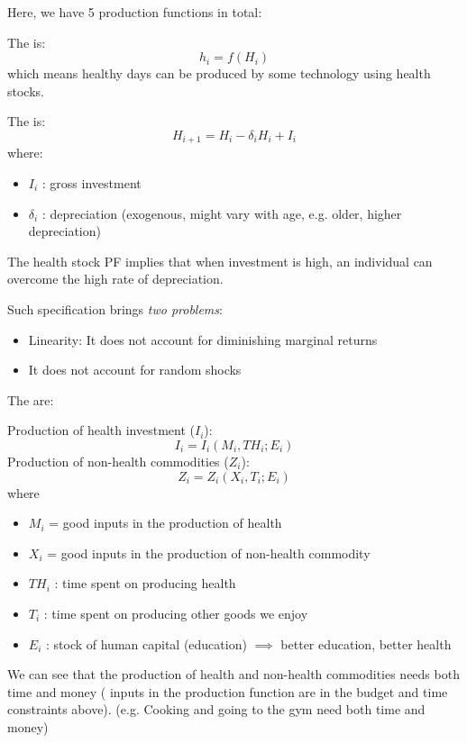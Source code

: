         Here, we have 5 production functions in total:

        The  is:
        \begin{equation*}
            h_i=f(H_i)
        \end{equation*}
        which means healthy days can be produced by some technology using health stocks.
        
        The  is:
        \begin{equation*}
            H_{i+1}=H_i-\delta_i H_i+I_i
        \end{equation*}
        where:
        \begin{itemize}
            \item $I_i$ : gross investment
            \item $\delta_i$ : depreciation (exogenous, might vary with age, e.g. older, higher depreciation)
        \end{itemize}
        The health stock PF implies that when investment is high, an individual can overcome the high rate of depreciation.

        Such specification brings \emph{two problems}:
        \begin{itemize}
            \item Linearity: It does not account for diminishing marginal returns
            \item It does not account for random shocks
        \end{itemize}

        The  are:

        Production of health investment ($I_i$):
        \begin{equation*}
            I_i=I_i(M_i,TH_i;E_i)
        \end{equation*}
        Production of non-health commodities ($Z_i$):
        \begin{equation*}
            Z_i=Z_i(X_i,T_i;E_i)
        \end{equation*}
        where
        \begin{itemize}
            \item $M_i$ = good inputs in the production of health
            \item $X_i$ = good inputs in the production of non-health commodity
            \item $TH_i$ : time spent on producing health
            \item $T_i$ : time spent on producing other goods we enjoy
            \item $E_i$ : stock of human capital (education) $\implies$ better education, better health
        \end{itemize}
        We can see that the production of health and non-health commodities needs both time and money (        inputs in the production function are in the budget and time constraints above). (e.g. Cooking and going to the gym need both time and money) 

